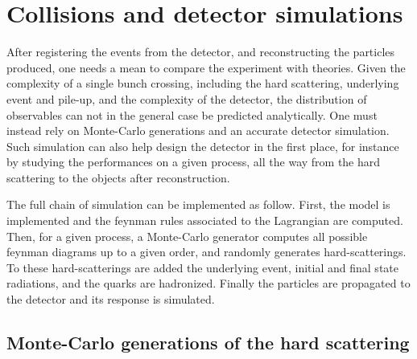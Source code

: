        \section{Collisions and detector simulations}

            After registering the events from the detector, and reconstructing the particles
            produced, one needs a mean to compare the experiment with theories. Given
            the complexity of a single bunch crossing, including the hard scattering,
            underlying event and pile-up, and the complexity of the detector, the distribution
            of observables can not in the general case be predicted analytically. One must
            instead rely on Monte-Carlo generations and an accurate detector simulation.
            Such simulation can also help design the detector in the first place, for
            instance by studying the performances on a given process, all the way
            from the hard scattering to the objects after reconstruction.

            The full chain of simulation can be implemented as follow. First, the model
            is implemented and the feynman rules associated to the Lagrangian are computed.
            Then, for a given process, a Monte-Carlo generator computes all possible
            feynman diagrams up to a given order, and randomly generates hard-scatterings.
            To these hard-scatterings are added the underlying event, initial and
            final state radiations, and the quarks are hadronized. Finally the particles
            are propagated to the detector and its response is simulated.

            \subsection{Monte-Carlo generations of the hard scattering}


